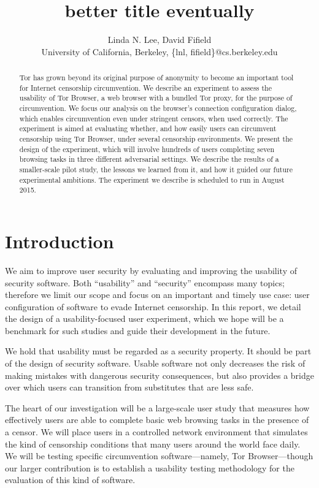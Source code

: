 \documentclass[letterpaper,twocolumn,11pt]{article}
\begin{document}
\title{{\color {red}better title eventually}}
\author{Linda N. Lee, David Fifield\\
University of California, Berkeley, \{lnl, fifield\}@cs.berkeley.edu
}
\maketitle
 
\begin{abstract}
\indent \indent Tor has grown beyond its original purpose of anonymity
to become an important tool for
Internet censorship circumvention.
We describe an experiment to assess the usability of Tor Browser,
a web browser with a bundled Tor proxy,
for the purpose of circumvention.
We focus our analysis on the browser's connection configuration dialog,
which enables circumvention even under stringent censors,
when used correctly.
The experiment is aimed at evaluating whether, and how easily users can circumvent censorship using Tor Browser,
under several censorship environments.
We present the design of the experiment,
which will involve hundreds of users completing seven browsing tasks in three different adversarial settings.
We describe the results of a smaller-scale pilot study,
the lessons we learned from it,
and how it guided our future experimental ambitions.
The experiment we describe is scheduled to run in August 2015.
\end{abstract}

\section{Introduction}

\indent \indent We aim to improve user security by evaluating
and improving the usability of security software.
Both ``usability'' and ``security'' encompass many topics;
therefore we limit our scope and focus on
an important and timely use case:
user configuration of software to evade Internet censorship.
In this report, we detail the design of a usability-focused user experiment,
which we hope will be a benchmark for such studies
and guide their development in the future.

We hold that usability must be regarded as a security property.
It should be part of the design of security software.
Usable software not only decreases the risk of making mistakes
with dangerous security consequences,
but also provides a bridge over which users can
transition from substitutes that are less safe.

The heart of our investigation will be a large-scale user study
that measures how effectively users are able to complete
basic web browsing tasks in the presence of a censor.
We will place users in a controlled network environment
that simulates the kind of censorship conditions that many
users around the world face daily.
We will be testing specific circumvention software---namely,
Tor Browser---though our larger contribution is to establish
a usability testing methodology for the evaluation
of this kind of software.
\end{document}
